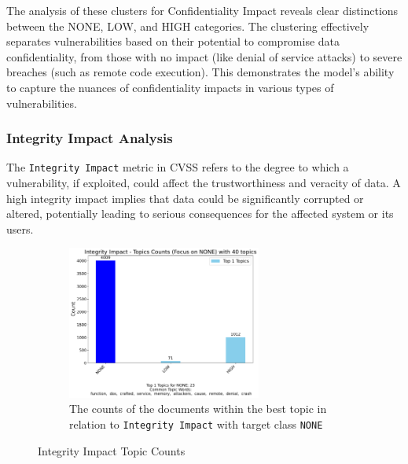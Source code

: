 \documentclass[12pt]{article}
\begin{document}
The analysis of these clusters for Confidentiality Impact reveals clear distinctions between the
NONE, LOW, and HIGH categories. The clustering effectively separates vulnerabilities based on their
potential to compromise data confidentiality, from those with no impact (like denial of service
attacks) to severe breaches (such as remote code execution). This demonstrates the model's ability
to capture the nuances of confidentiality impacts in various types of vulnerabilities.

\subsubsection{Integrity Impact Analysis}

The \texttt{Integrity Impact} metric in CVSS refers to the degree to which a vulnerability, if exploited,
could affect the trustworthiness and veracity of data. A high integrity impact implies that data
could be significantly corrupted or altered, potentially leading to serious consequences for the
affected system or its users.

\begin{figure}[h!]
	\ContinuedFloat*
	\centering
	\begin{subfigure}{\textwidth}
		\centering
		\includegraphics[width=0.7\textwidth]{figures/integrityImpact/merged_top_k_topics_category_focus_counts_integrityImpact_NONE_k1.pdf}
		\caption{The counts of the documents within the best topic in relation to \texttt{Integrity
				Impact} with
			target class \texttt{NONE}}

		\label{fig:integrityImpact_60_NONE}
	\end{subfigure}
	\caption{Integrity Impact Topic Counts}

\end{figure}
\end{document}

